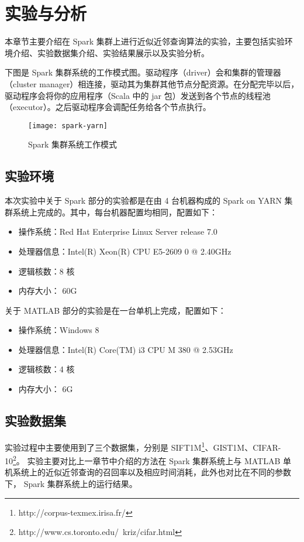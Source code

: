 

\chapter{实验与分析}
\label{cha:experiments_analysis}
本章节主要介绍在 Spark 集群上进行近似近邻查询算法的实验，主要包括实验环境介绍、实验数据集介绍、实验结果展示以及实验分析。

下图是 Spark 集群系统的工作模式图。驱动程序（driver）会和集群的管理器（cluster manager）相连接，驱动其为集群其他节点分配资源。在分配完毕以后，驱动程序会将你的应用程序（Scala 中的 jar 包）发送到各个节点的线程池（executor）。之后驱动程序会调配任务给各个节点执行。
\label{cha:experiments_analysis}
\begin{figure}[H]
  \centering
  \texttt{[image: spark-yarn]}
  \caption{Spark 集群系统工作模式}
  \label{fig:spark-yarn}
\end{figure}
\section{实验环境}
本次实验中关于 Spark 部分的实验都是在由 4 台机器构成的 Spark on YARN 集群系统上完成的。其中，每台机器配置均相同，配置如下：
\begin{itemize}
\item 操作系统：Red Hat Enterprise Linux Server release 7.0
\item 处理器信息：Intel(R) Xeon(R) CPU E5-2609 0 @ 2.40GHz
\item 逻辑核数：8 核
\item 内存大小： 60G
\end{itemize}

关于 MATLAB 部分的实验是在一台单机上完成，配置如下：
\begin{itemize}
\item 操作系统：Windows 8
\item 处理器信息：Intel(R) Core(TM) i3 CPU M 380 @ 2.53GHz
\item 逻辑核数：4 核
\item 内存大小： 6G
\end{itemize}
\section{实验数据集}
实验过程中主要使用到了三个数据集，分别是 SIFT1M\footnote{http://corpus-texmex.irisa.fr/\label{fn:repeat}}、GIST1M\footnotemark[1]、CIFAR-10\footnote{http://www.cs.toronto.edu/~kriz/cifar.html}。 实验主要对比上一章节中介绍的方法在 Spark 集群系统上与 MATLAB 单机系统上的近似近邻查询的召回率以及相应时间消耗，此外也对比在不同的参数下， Spark 集群系统上的运行结果。
